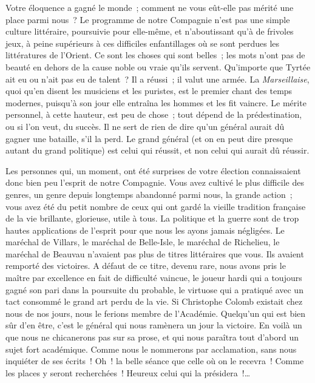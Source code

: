 \documentclass[french,twoside]{book} %
\newcommand\orgName[1]{#1}
\newcommand\persName[1]{#1}
\newcommand\placeName[1]{#1}
\begin{document}
Votre éloquence a gagné le monde ; comment ne vous eût-elle pas mérité une place parmi nous ? Le programme de notre {\orgName Compagnie} n’est pas une simple culture littéraire, poursuivie pour elle-même, et n’aboutissant qu’à de frivoles jeux, à peine supérieurs à ces difficiles enfantillages où se sont perdues les littératures de l’{\placeName Orient}. Ce sont les choses qui sont belles ; les mots n’ont pas de beauté en dehors de la cause noble ou vraie qu’ils servent. Qu’importe que {\persName Tyrtée} ait eu ou n’ait pas eu de talent ? Il a réussi ; il valut une armée. La \emph{Marseillaise}, quoi qu’en disent les musiciens et les puristes, est le premier chant des temps modernes, puisqu’à son jour elle entraîna les hommes et les fit vaincre. Le mérite personnel, à cette hauteur, est peu de chose ; tout dépend de la prédestination, ou si l’on veut, du succès. Il ne sert de rien de dire qu’un général aurait dû gagner une bataille, s’il la perd. Le grand général (et on en peut dire presque autant du grand politique) est celui qui réussit, et non celui qui aurait dû réussir.\par
Les personnes qui, un moment, ont été surprises de votre élection connaissaient donc bien peu l’esprit de notre {\orgName Compagnie}. Vous avez cultivé le plus difficile des genres, un genre depuis longtemps abandonné parmi nous, la grande action ; vous avez été du petit nombre de ceux qui ont gardé la vieille tradition française de la vie brillante, glorieuse, utile à tous. La politique et la guerre sont de trop hautes applications de l’esprit pour que nous les ayons jamais négligées. Le {\persName maréchal de Villars}, le {\persName maréchal de Belle-Isle}, le {\persName maréchal de Richelieu}, le {\persName maréchal de Beauvau} n’avaient pas plus de titres littéraires que vous. Ils avaient remporté des victoires. A défaut de ce titre, devenu rare, nous avons pris le maître par excellence en fait de difficulté vaincue, le joueur hardi qui a toujours gagné son pari dans la poursuite du probable, le virtuose qui a pratiqué avec un tact consommé le grand art perdu de la vie. Si {\persName Christophe Colomb} existait chez nous de nos jours, nous le ferions membre de l’{\orgName Académie}. Quelqu’un qui est bien sûr d’en être, c’est le général qui nous ramènera un jour la victoire. En voilà un que nous ne chicanerons pas sur sa prose, et qui nous paraîtra tout d’abord un sujet fort académique. Comme nous le nommerons par acclamation, sans nous inquiéter de ses écrits ! Oh ! la belle séance que celle où on le recevra ! Comme les places y seront recherchées ! Heureux celui qui la présidera !…\par
\end{document}
